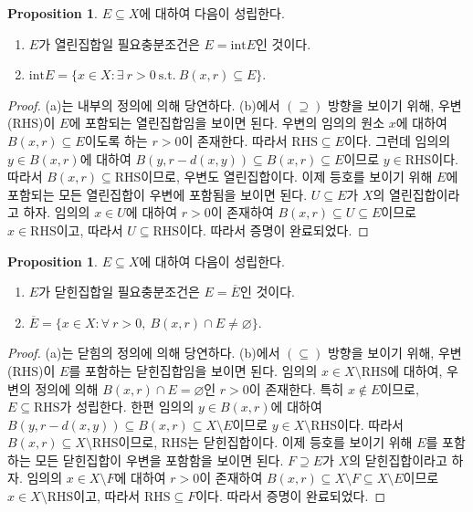 \documentclass[11pt]{book}
\numberwithin{equation}{chapter}
\def\Int{\text{int}}
\theoremstyle{definition}
\newtheorem{prop}[thm]{Proposition}
\begin{document}
\begin{prop}
    \(E \subseteq X\)에 대하여 다음이 성립한다.
    \begin{enumerate}[label=(\alph*), leftmargin=2\parindent]
        \item \(E\)가 열린집합일 필요충분조건은 \(E = \Int E\)인 것이다.
        \item \(\Int E = \{x \in X : \exists \ r > 0 \ \text{s.t.} \ B(x, r) \subseteq E\}\).
    \end{enumerate}
\end{prop}
\begin{proof}
    (a)는 내부의 정의에 의해 당연하다. (b)에서 \((\supseteq)\) 방향을 보이기 위해, 우변(RHS)이 \(E\)에 포함되는 열린집합임을 보이면 된다. 우변의 임의의 원소 \(x\)에 대하여 \(B(x, r) \subseteq E\)이도록 하는 \(r > 0\)이 존재한다. 따라서 \(\text{RHS} \subseteq E\)이다. 그런데 임의의 \(y \in B(x, r)\)에 대하여 \(B(y, r - d(x, y)) \subseteq B(x, r) \subseteq E\)이므로 \(y \in \text{RHS}\)이다. 따라서 \(B(x, r) \subseteq \text{RHS}\)이므로, 우변도 열린집합이다. 이제 등호를 보이기 위해 \(E\)에 포함되는 모든 열린집합이 우변에 포함됨을 보이면 된다. \(U \subseteq E\)가 \(X\)의 열린집합이라고 하자. 임의의 \(x \in U\)에 대하여 \(r > 0\)이 존재하여 \(B(x, r) \subseteq U \subseteq E\)이므로 \(x \in \text{RHS}\)이고, 따라서 \(U \subseteq \text{RHS}\)이다. 따라서 증명이 완료되었다.
\end{proof}

\begin{prop} \label{prop 4.1.10}
    \(E \subseteq X\)에 대하여 다음이 성립한다.
    \begin{enumerate}[label=(\alph*), leftmargin=2\parindent]
        \item \(E\)가 닫힌집합일 필요충분조건은 \(E = \overline{E}\)인 것이다.
        \item \(\overline{E} = \{x \in X : \forall \ r > 0, \ B(x, r) \cap E \ne \varnothing\}\).
    \end{enumerate}
\end{prop}
\begin{proof}
    (a)는 닫힘의 정의에 의해 당연하다. (b)에서 \((\subseteq)\) 방향을 보이기 위해, 우변(RHS)이 \(E\)를 포함하는 닫힌집합임을 보이면 된다. 임의의 \(x \in X \setminus \text{RHS}\)에 대하여, 우변의 정의에 의해 \(B(x, r) \cap E = \varnothing\)인 \(r > 0\)이 존재한다. 특히 \(x \notin E\)이므로, \(E \subseteq \text{RHS}\)가 성립한다. 한편 임의의 \(y \in B(x, r) \)에 대하여 \(B(y, r - d(x, y)) \subseteq B(x, r) \subseteq X \setminus E\)이므로 \(y \in X \setminus \text{RHS}\)이다. 따라서 \(B(x, r) \subseteq X \setminus \text{RHS}\)이므로, \(\text{RHS}\)는 닫힌집합이다. 이제 등호를 보이기 위해 \(E\)를 포함하는 모든 닫힌집합이 우변을 포함함을 보이면 된다. \(F \supseteq E\)가 \(X\)의 닫힌집합이라고 하자. 임의의 \(x \in X \setminus F\)에 대하여 \(r > 0\)이 존재하여 \(B(x, r) \subseteq X \setminus F \subseteq X \setminus E\)이므로 \(x \in X \setminus \text{RHS}\)이고, 따라서 \(\text{RHS} \subseteq F\)이다. 따라서 증명이 완료되었다.
\end{proof}
\end{document}
